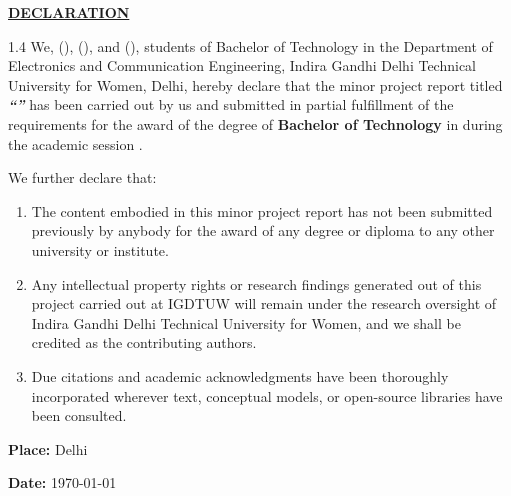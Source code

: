 \thispagestyle{empty}
\vspace*{-0.8cm}
\begin{center}
	{\Large\textbf{\underline{DECLARATION}}}\par
\end{center}

\vspace{0.3cm}
\begin{spacing}{1.4}
\sloppy
\noindent We, \textbf{\printStuNameA} (\textbf{\printStuUSNA}), \textbf{\printStuNameB} (\textbf{\printStuUSNB}), and \textbf{\printStuNameC} (\textbf{\printStuUSNC}), students of Bachelor of Technology in the Department of Electronics and Communication Engineering, Indira Gandhi Delhi Technical University for Women, Delhi, hereby declare that the minor project report titled \textbf{\textit{``\printTitle''}} has been carried out by us and submitted in partial fulfillment of the requirements for the award of the degree of \textbf{Bachelor of Technology} in \textbf{\printDepartmentLF} during the academic session \printAcadYear.\par

\noindent We further declare that:
\begin{enumerate}
	\item The content embodied in this minor project report has not been submitted previously by anybody for the award of any degree or diploma to any other university or institute.
	\item Any intellectual property rights or research findings generated out of this project carried out at IGDTUW will remain under the research oversight of Indira Gandhi Delhi Technical University for Women, and we shall be credited as the contributing authors.
	\item Due citations and academic acknowledgments have been thoroughly incorporated wherever text, conceptual models, or open-source libraries have been consulted.
\end{enumerate}
\end{spacing}

\vfill
\noindent \textbf{Place:} Delhi\par\vspace{0.2cm}
\noindent \textbf{Date:} \today\par\vspace{1.2cm}

